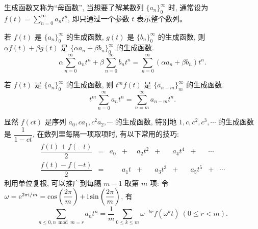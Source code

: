 生成函数又称为“母函数”, 当想要了解某数列 $\{a_n\}_0^{\infty}$ 时, 通常设为
$\displaystyle f(t)=\sum_{n=0}^{\infty}a_nt^n$, 即只通过一个参数 $t$ 表示整个数列。

\begin{theorem}[加法性质]
    若 $f(t)$ 是 $\{a_n\}_0^{\infty}$ 的生成函数, $g(t)$ 是 $\{b_n\}_0^{\infty}$ 的生成函数, 
    则 $\alpha f(t)+\beta g(t)$ 是 $\{\alpha a_n+\beta b_n\}_0^{\infty}$ 的生成函数.
    $$\alpha\sum_{n=0}^{\infty}a_nt^n+\beta\sum_{n=0}^{\infty}b_nt^n=\sum_{n=0}^{\infty}(\alpha a_n+\beta b_n)t^n.$$
\end{theorem}
\begin{theorem}[移位性质]
    若 $f(t)$ 是 $\{a_n\}_0^{\infty}$ 的生成函数, 则 $t^mf(t)$ 是 $\{a_{n-m}\}_m^{\infty}$ 的生成函数.
    $$t^m\sum_{n=0}^{\infty}a_nt^n=\sum_{n=m}^{\infty}a_{n-m}t^n.$$
\end{theorem}
\begin{theorem}[变换性质]
    显然 $f(ct)$ 是序列 $a_0,ca_1,c^2a_2,\cdots$ 的生成函数, 特别地 $1,c,c^2,c^3,\cdots$ 的生成函数是 $\dfrac{1}{1-ct}$, 
    在数列里每隔一项取项时, 有以下常用的技巧:
    $$\begin{matrix}
            \dfrac{f(t)+f(-t)}{2} & = & a_0 & +    & a_2t^2 & +      & a_4t^4 & +      & \cdots &        \\
            \dfrac{f(t)-f(-t)}{2} & = &     & a_1t & +      & a_3t^3 & +      & a_5t^5 & +      & \cdots
        \end{matrix}$$
    利用单位复根, 可以推广到每隔 $m-1$ 取第 $m$ 项: 令 $\omega=\mathrm{e} ^{2\pi\mathrm{i}/m}=\cos\left(\dfrac{2\pi}{m}\right)+\mathrm{i}\sin\left(\dfrac{2\pi}{m}\right)$, 有
    $$\sum_{n\leqslant 0,n\bmod m=r}a_nt^n=\dfrac{1}{m}\sum_{0\leqslant k\leqslant m}\omega^{-kr}f\left(\omega^kt\right)~  (0\leqslant r<m).$$
\end{theorem}

